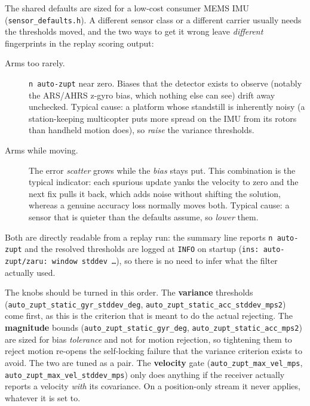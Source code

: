 \documentclass[11pt,a4paper]{article}
\newcommand{\code}[1]{\texttt{#1}}
\begin{document}
The shared defaults are sized for a low-cost consumer MEMS IMU
(\code{sensor\_\allowbreak{}defaults.h}). A different sensor class or a different
carrier usually needs the thresholds moved, and the two ways to get it
wrong leave \emph{different} fingerprints in the replay scoring output:

\begin{description}
  \item[Arms too rarely.] \code{n auto-zupt} near zero. Biases that the
    detector exists to observe (notably the ARS/AHRS z-gyro bias, which
    nothing else can see) drift away unchecked. Typical cause: a
    platform whose standstill is inherently noisy (a station-keeping
    multicopter puts more spread on the IMU from its rotors than
    handheld motion does), so \emph{raise} the variance thresholds.
  \item[Arms while moving.] The error \emph{scatter} grows while the
    \emph{bias} stays put. This combination is the typical indicator: each
    spurious update yanks the velocity to zero and the next fix pulls it
    back, which adds noise without shifting the solution, whereas a
    genuine accuracy loss normally moves both. Typical cause: a sensor
    that is quieter than the defaults assume, so \emph{lower} them.
\end{description}

Both are directly readable from a replay run: the summary line reports
\code{n auto-zupt} and the resolved thresholds are logged at
\code{INFO} on startup (\code{ins: auto-zupt/zaru: window stddev
\ldots}), so there is no need to infer what the filter actually used.

The knobs should be turned in this order. The \textbf{variance} thresholds
(\code{auto\_\allowbreak{}zupt\_\allowbreak{}static\_\allowbreak{}gyr\_\allowbreak{}stddev\_\allowbreak{}deg},
\code{auto\_\allowbreak{}zupt\_\allowbreak{}static\_\allowbreak{}acc\_\allowbreak{}stddev\_\allowbreak{}mps2}) come first, as this is the
criterion that is meant to do the actual rejecting. The \textbf{magnitude}
bounds (\code{auto\_\allowbreak{}zupt\_\allowbreak{}static\_\allowbreak{}gyr\_\allowbreak{}deg},
\code{auto\_\allowbreak{}zupt\_\allowbreak{}static\_\allowbreak{}acc\_\allowbreak{}mps2}) are sized for bias
\emph{tolerance} and not for motion rejection, so tightening them to reject
motion re-opens the self-locking failure that the variance criterion exists
to avoid. The two are tuned as a pair. The \textbf{velocity} gate
(\code{auto\_\allowbreak{}zupt\_\allowbreak{}max\_\allowbreak{}vel\_\allowbreak{}mps},
\code{auto\_\allowbreak{}zupt\_\allowbreak{}max\_\allowbreak{}vel\_\allowbreak{}stddev\_\allowbreak{}mps}) only does anything if the
receiver actually reports a velocity \emph{with} its covariance. On a
position-only stream it never applies, whatever it is set to.
\end{document}
